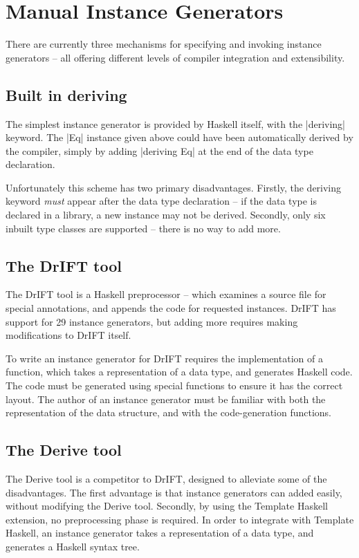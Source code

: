 \documentclass{llncs}
\begin{document}
\section{Manual Instance Generators}
\label{sec:manual_instances}

There are currently three mechanisms for specifying and invoking instance generators -- all offering different levels of compiler integration and extensibility.

\subsection{Built in deriving}

The simplest instance generator is provided by Haskell itself, with the |deriving| keyword. The |Eq| instance given above could have been automatically derived by the compiler, simply by adding |deriving Eq| at the end of the data type declaration.

Unfortunately this scheme has two primary disadvantages. Firstly, the deriving keyword \textit{must} appear after the data type declaration -- if the data type is declared in a library, a new instance may not be derived. Secondly, only six inbuilt type classes are supported -- there is no way to add more.

\subsection{The DrIFT tool}

The DrIFT tool \cite{drift} is a Haskell preprocessor -- which examines a source file for special annotations, and appends the code for requested instances. DrIFT has support for 29 instance generators, but adding more requires making modifications to DrIFT itself.

To write an instance generator for DrIFT requires the implementation of a function, which takes a representation of a data type, and generates Haskell code. The code must be generated using special functions to ensure it has the correct layout. The author of an instance generator must be familiar with both the representation of the data structure, and with the code-generation functions.

\subsection{The Derive tool}

The Derive tool \cite{derive} is a competitor to DrIFT, designed to alleviate some of the disadvantages. The first advantage is that instance generators can added easily, without modifying the Derive tool. Secondly, by using the Template Haskell \cite{template_haskell} extension, no preprocessing phase is required. In order to integrate with Template Haskell, an instance generator takes a representation of a data type, and generates a Haskell syntax tree.
\end{document}
